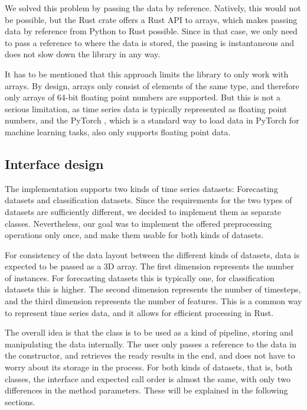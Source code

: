 \documentclass[review]{AIM_report}
\begin{document}
We solved this problem by passing the data by reference. Natively, this would not be possible, but the Rust crate \numpy offers a Rust API to \numpy arrays, which makes passing data by reference from Python to Rust possible. Since in that case, we only need to pass a reference to where the data is stored, the passing is instantaneous and does not slow down the library in any way.

It has to be mentioned that this approach limits the library to only work with \numpy arrays. By design, \numpy arrays only consist of elements of the same type, and therefore only arrays of 64-bit floating point numbers are supported. But this is not a serious limitation, as time series data is typically represented as floating point numbers, and the PyTorch \dataLoader, which is a standard way to load data in PyTorch for machine learning tasks, also only supports floating point data.

\subsection{Interface design}

The implementation supports two kinds of time series datasets: Forecasting datasets and classification datasets. Since the requirements for the two types of datasets are sufficiently different, we decided to implement them as separate classes. Nevertheless, our goal was to implement the offered preprocessing operations only once, and make them usable for both kinds of datasets.

For consistency of the data layout between the different kinds of datasets, data is expected to be passed as a 3D \numpy array. The first dimension represents the number of instances.  For forecasting datasets this is typically one, for classification datasets this is higher. The second dimension represents the number of timesteps, and the third dimension represents the number of features. This is a common way to represent time series data, and it allows for efficient processing in Rust.

The overall idea is that the class is to be used as a kind of pipeline, storing and manipulating the data internally. The user only passes a reference to the data in the constructor, and retrieves the ready results in the end, and does not have to worry about its storage in the process. For both kinds of datasets, that is, both classes, the interface and expected call order is almost the same, with only two differences in the method parameters. These will be explained in the following sections.
\end{document}
